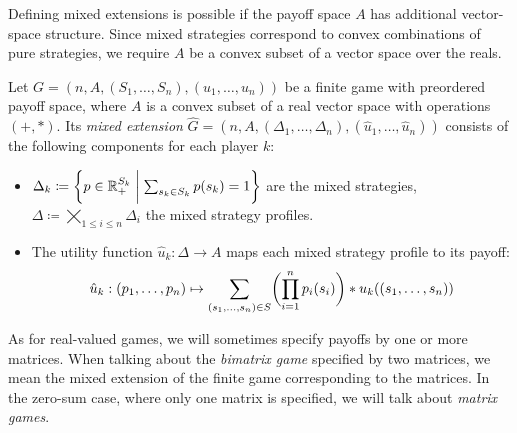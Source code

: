 \documentclass[a4paper]{scrreprt}
\newcommand{\Rp}{\mathbb{R}_+}
\newcommand{\B}{\mathcal{B}}
\begin{document}
    Defining mixed extensions is possible if the payoff space $A$ has additional vector-space structure. Since mixed strategies correspond to convex combinations of pure strategies, we require $A$ be a convex subset of a vector space over the reals.
    \begin{defn}
        Let $G = (n, A, (S_1, \dots, S_n), (u_1, \dots, u_n))$ be a finite game with preordered payoff space,
        where $A$ is a convex subset of a real vector space with operations $(+, *)$.
        Its \emph{mixed extension} $\hat{G} = (n, A, (\Delta_1, \dots, \Delta_n), (\hat{u}_1, \dots, \hat{u}_n))$ consists of the following components for each player $k$:
        \begin{itemize} %
            \item $\Delta_k \coloneqq \biggset{ p \in \Rp^{S_k} \biggmid \sum_{s_k \in S_k} p(s_k) = 1 } $ are the mixed strategies, $\Delta \coloneqq \bigtimes\limits_{1\leq i \leq n} \Delta_i$ the mixed strategy profiles.
            
            \item
            The utility function $\hat{u}_k: \Delta \to A$ maps each mixed strategy profile to
            its payoff:
            \begin{gather}
            \hat{u}_k: 
            (p_1, \dots, p_n) 
            \mapsto
            \sum_{(s_1, \dots, s_n) \in S} \biggl(\prod_{i=1}^{n} p_i(s_i)\biggr) * u_k( (s_1, \dots, s_n) )
            \label{eq:preorderedPayoffSpaceMixedStrategyUtility}
            \end{gather}
        \end{itemize}
    \end{defn}
    As for real-valued games, we will sometimes specify payoffs by one or more matrices.
    When talking about the \emph{bimatrix game} specified by two matrices, we mean the mixed extension of the finite game corresponding to the matrices.
    In the zero-sum case, where only one matrix is specified, we will talk about \emph{matrix games}.
    
\end{document}
